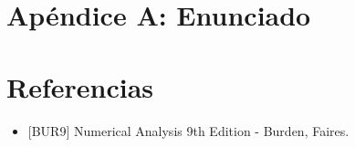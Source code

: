 \section{Apéndice A: Enunciado}


\section{Referencias}

\begin{itemize}
\item $[$BUR9$]$ Numerical Analysis 9th Edition - Burden, Faires.
\end{itemize}